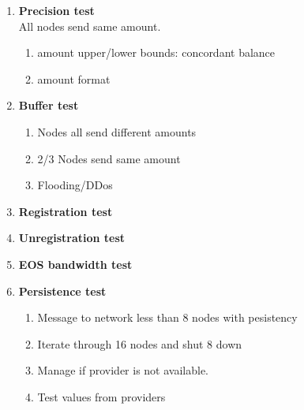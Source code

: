 \documentclass[]{article}
\begin{document}
					\begin{enumerate}
					\item \textbf{Precision test}\\
					All nodes send same amount.
						\begin{enumerate}
						\item amount upper/lower bounds: concordant balance
						\item amount format  
						\end{enumerate}
					\item \textbf{Buffer test}\\
					\begin{enumerate}
						\item Nodes all send different amounts 
						\item 2/3 Nodes send same amount
						\item Flooding/DDos  
					\end{enumerate}
						\item \textbf{Registration test}\\
						\item \textbf{Unregistration test}\\
						\item \textbf{EOS bandwidth test}\\
						\item \textbf{Persistence test}\\
							\begin{enumerate}
								\item Message to network less than 8 nodes with pesistency
								\item Iterate through 16 nodes and shut 8 down
								\item Manage if provider is not available.
								\item Test values from providers
							\end{enumerate}
				\end{enumerate}
	
\end{document}
